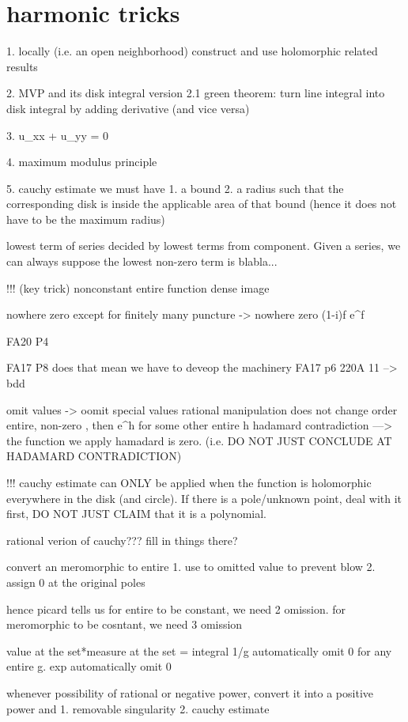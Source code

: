 \section*{harmonic tricks}
1. locally (i.e. an open neighborhood) construct and use holomorphic related results

2. MVP and its disk integral version
	2.1 green theorem: turn line integral into disk integral by adding derivative (and vice versa)

3. u_xx + u_yy = 0

4. maximum modulus principle

5. cauchy estimate 
	we must have
	1. a bound 
	2. a radius such that the corresponding disk is inside the applicable area of that bound (hence it does not have to be the maximum radius)

lowest term of series decided by lowest terms from component. 
Given a series, we can always suppose the lowest non-zero term is blabla...

!!! (key trick) nonconstant entire function dense image

nowhere zero except for finitely many puncture -> nowhere zero
(1-i)f
e^f

FA20 P4

FA17 P8 does that mean we have to deveop the machinery
FA17 p6
220A 11 --> bdd

omit values -> oomit special values
rational manipulation does not change order
entire, non-zero , then e^h for some other entire h
hadamard contradiction ---> the function we apply hamadard is zero. (i.e. DO NOT JUST CONCLUDE AT HADAMARD CONTRADICTION)

!!! cauchy estimate can ONLY be applied when the function is holomorphic everywhere in the disk (and circle). If there is a pole/unknown point, deal with it first, DO NOT JUST CLAIM that it is a polynomial.

rational verion of cauchy??? fill in things there?



convert an meromorphic to entire
	1. use to omitted value to prevent blow
	2. assign 0 at the original poles

hence picard tells us for entire to be constant, we need 2 omission. for meromorphic to be cosntant, we need 3 omission

value at the set*measure at the set = integral
1/g automatically omit 0 for any entire g.
exp automatically omit 0

whenever possibility of rational or negative power, convert it into a positive power and 
	1. removable singularity
	2. cauchy estimate


